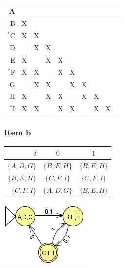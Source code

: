 {\begin{center}
\begin{tabular}{r || c | c | c | c | c | c | c | c | c}
	A  & \cellcolor{gray} & \cellcolor{gray} & \cellcolor{gray} & \cellcolor{gray} & \cellcolor{gray} & \cellcolor{gray} & \cellcolor{gray} & \cellcolor{gray} & \cellcolor{gray} \\ \hline
	B  & X  & \cellcolor{gray} & \cellcolor{gray} & \cellcolor{gray} & \cellcolor{gray} & \cellcolor{gray} & \cellcolor{gray} & \cellcolor{gray} & \cellcolor{gray} \\ \hline
	$^*$C & X  & X  & \cellcolor{gray} & \cellcolor{gray} & \cellcolor{gray} & \cellcolor{gray} & \cellcolor{gray} & \cellcolor{gray} & \cellcolor{gray} \\ \hline
	D  &    & X  & X  & \cellcolor{gray} & \cellcolor{gray} & \cellcolor{gray} & \cellcolor{gray} & \cellcolor{gray} & \cellcolor{gray} \\ \hline
	E  & X  &    & X  & X  & \cellcolor{gray} & \cellcolor{gray} & \cellcolor{gray} & \cellcolor{gray} & \cellcolor{gray} \\ \hline
	$^*$F & X  & X  &    & X  & X  & \cellcolor{gray} & \cellcolor{gray} & \cellcolor{gray} & \cellcolor{gray} \\ \hline
	G  &    & X  & X  &    & X  & X  & \cellcolor{gray} & \cellcolor{gray} & \cellcolor{gray} \\ \hline
	H  & X  &    & X  & X  &    & X  & X  & \cellcolor{gray} & \cellcolor{gray} \\ \hline
	$^*$I & X  & X  &    & X  & X  &    & X  & X  & \cellcolor{gray} 
\end{tabular} \end{center}
\subsubsection{Item b}
\begin{center}
\begin{minipage}[c]{0.45\textwidth}
\begin{center} \begin{tabular}{r | c c}
	$\delta   $ & $0        $ & $1        $ \\ \hline
	$\{A,D,G\}$ & $\{B,E,H\}$ & $\{B,E,H\}$ \\
	$\{B,E,H\}$ & $\{C,F,I\}$ & $\{C,F,I\}$ \\
	$\{C,F,I\}$ & $\{A,D,G\}$ & $\{B,E,H\}$
\end{tabular} \end{center}
\end{minipage}%
\begin{minipage}[c]{0.25\textwidth}
\begin{center} \includegraphics[scale=0.5]{TP07_5b} \end{center}
\end{minipage}
\end{center}
}
